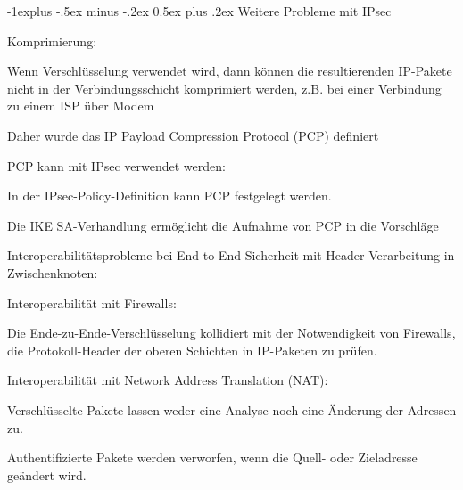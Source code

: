 \documentclass[a4paper]{article}
\makeatletter
\renewcommand{\subsection}{\@startsection{subsection}{2}{0mm}%
 {-1explus -.5ex minus -.2ex}%
 {0.5ex plus .2ex}%
 {\normalfont\normalsize\bfseries}}
\makeatother
\begin{document}
\begin{multicols}{3}
\begin{itemize*}
            \subsection{Weitere Probleme mit IPsec}
            \begin{itemize*}
                  \item Komprimierung:
                  \begin{itemize*}
                        \item Wenn Verschlüsselung verwendet wird, dann können die resultierenden IP-Pakete nicht in der Verbindungsschicht komprimiert werden, z.B. bei einer Verbindung zu einem ISP über Modem
                        \item Daher wurde das IP Payload Compression Protocol (PCP) definiert
                        \item PCP kann mit IPsec verwendet werden:
                        \begin{itemize*}
                              \item In der IPsec-Policy-Definition kann PCP festgelegt werden.
                              \item Die IKE SA-Verhandlung ermöglicht die Aufnahme von PCP in die Vorschläge
                        \end{itemize*}
                  \end{itemize*}
                  \item Interoperabilitätsprobleme bei End-to-End-Sicherheit mit
                  Header-Verarbeitung in Zwischenknoten:
                  \begin{itemize*}
                        \item Interoperabilität mit Firewalls:
                        \begin{itemize*}
                              \item Die Ende-zu-Ende-Verschlüsselung kollidiert mit der Notwendigkeit von Firewalls, die Protokoll-Header der oberen Schichten in IP-Paketen zu prüfen.
                        \end{itemize*}
                        \item Interoperabilität mit Network Address Translation (NAT):
                        \begin{itemize*}
                              \item Verschlüsselte Pakete lassen weder eine Analyse noch eine Änderung der Adressen zu.
                              \item Authentifizierte Pakete werden verworfen, wenn die Quell- oder Zieladresse geändert wird.
                        \end{itemize*}
                  \end{itemize*}
            \end{itemize*}


\end{itemize*}
\end{multicols}
\end{document}
